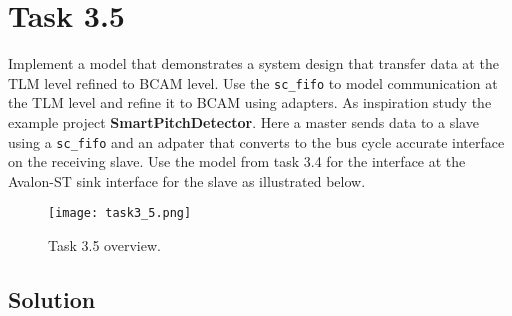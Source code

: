 \documentclass[../main.tex]{subfiles}
\begin{document}
\section{Task 3.5}

Implement a model that demonstrates a system design that transfer data at the TLM level refined to BCAM level. Use the \texttt{sc\_fifo} to model communication at the TLM level and refine it to BCAM using adapters. As inspiration study the example project \textbf{SmartPitchDetector}. Here a master sends data to a slave using a \texttt{sc\_fifo} and an adpater that converts to the bus cycle accurate interface on the receiving slave. Use the model from task 3.4 for the interface at the Avalon-ST sink interface for the slave as illustrated below.

\begin{figure}[h]
    \centering
    \texttt{[image: task3\_5.png]}
    \caption{Task 3.5 overview.}
\end{figure}

\subsection*{Solution}
\end{document}
